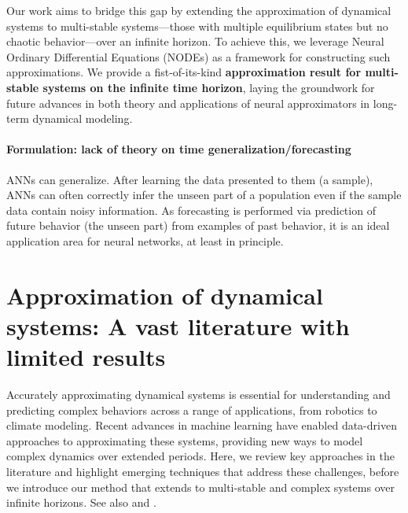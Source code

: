 \documentclass{article}
\theoremstyle{definition}
\theoremstyle{remark}
\newcounter{ct}
\begin{document}
Our work aims to bridge this gap by extending the approximation of dynamical systems to multi-stable systems—those with multiple equilibrium states but no chaotic behavior—over an infinite horizon. 
To achieve this, we leverage Neural Ordinary Differential Equations (NODEs) as a framework for constructing such approximations.
We provide a fist-of-its-kind \textbf{approximation result for multi-stable systems on the infinite time horizon}, laying the groundwork for future advances in both theory and applications of neural approximators in long-term dynamical modeling.



\paragraph{Formulation: lack of theory on time generalization/forecasting}
ANNs can generalize. After learning the data presented to them (a sample), ANNs can often correctly infer the unseen part of a population even if the sample data contain noisy information. As forecasting is performed via prediction of future behavior (the unseen part) from examples of past behavior, it is an ideal application area for neural networks, at least in principle. \citep{zhang1998forecasting}



\section{Approximation of dynamical systems: A vast literature with limited results}
Accurately approximating dynamical systems is essential for understanding and predicting complex behaviors across a range of applications, from robotics to climate modeling.
Recent advances in machine learning have enabled data-driven approaches to approximating these systems, providing new ways to model complex dynamics over extended periods.
Here, we review key approaches in the literature and highlight emerging techniques that address these challenges, before we introduce our method that extends to multi-stable and complex systems over infinite horizons.
%
See also \citep{li2022approximation} and \citep{jiang2023brief}.
\end{document}
